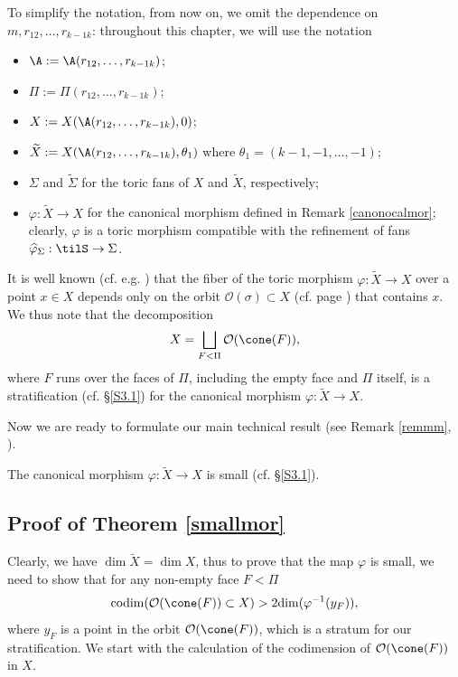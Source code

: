 To simplify the notation, from now on, we omit the dependence on $m, 
r_{12}, \ldots ,r_{k-1 k}$:  
throughout this chapter, we will use the notation
\begin{itemize}\label{omitnot}
\item $\A:=\A(r_{12}, \ldots ,r_{k-1 k})$;
\item $\Pi := \Pi(r_{12}, \ldots ,r_{k-1 k})$;
\item $X:=X(\A(r_{12}, \ldots ,r_{k-1 k}), 0)$;
\item  $ \widetilde{X}:= X(\A(r_{12}, \ldots ,r_{k-1 k}), \theta_1)$ where $\theta_1= (k-1,-1, \ldots ,-1)$;
\item $\Sigma$ and $\widetilde{\Sigma}$ for the toric fans of $X$ and $\widetilde{X}$, respectively;
\item $\varphi:  \widetilde{X} \to X$ for the canonical morphism defined in Remark \ref{canonocalmor}; clearly, $\varphi$ is a toric morphism compatible with the refinement of fans $\widehat{\varphi}_\Sigma: \tilS\to \Sigma$.
\end{itemize}




It is well known (cf.  e.g. \cite{Yau}) that the fiber of the toric morphism 
$\varphi:  \widetilde{X} \to X$ over a point $x\in X$ depends only on the orbit 
$\mathcal{O}(\sigma)\subset X$ (cf.  page \pageref{notation:toricorb}) that 
contains $x$. We thus note  that the decomposition $$X = \bigsqcup_{F<\Pi} 
\mathcal{O}(\cone(F)),$$ where $F$ runs over the faces of $\Pi$, including  the 
empty face and $\Pi$ itself, is a stratification (cf.  \S\ref{S3.1}) for the 
canonical morphism $\varphi:\widetilde{X}\to X$. 



Now we are ready to formulate our main technical result (see Remark 
\ref{remmm}, \cite[Proposition 4.17]{MM}).

\begin{theorem}\label{smallmor}
The canonical morphism $\varphi:  \widetilde{X} \to X$ is small (cf.  
\S\ref{S3.1}). 
\end{theorem} 




\subsection{Proof of Theorem \ref{smallmor}}

Clearly, we have $ \dim \widetilde{X}=\dim X$, thus to prove that the map 
$\varphi$ is small, we need to show that for any non-empty face $F<\Pi$ 
\begin{equation}\label{oursmallest} 
\mathrm{codim}(\mathcal{O}(\cone(F))\subset X) > 2\mathrm{dim}(\varphi^{-1}(y_F)), 
\end{equation}
where $y_F$ is a point in the orbit $\mathcal{O}(\cone(F))$, which is a stratum 
for our stratification. We start with the calculation of the codimension of 
$\mathcal{O}(\cone(F))$ in $X$. 




